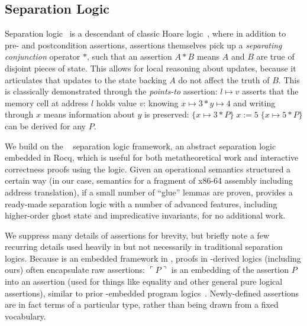\subsection{Separation Logic}
\label{sec:seplogic}
Separation logic~\cite{reynolds02} is a descendant of classic Hoare logic~\cite{hoare69},
where in addition to pre- and postcondition assertions, assertions themselves pick up a
\emph{separating conjunction} operator $\ast$, such that an assertion $A\ast B$ means $A$ and $B$ are true
of disjoint pieces of state. This allows for local reasoning about updates, because it articulates
that updates to the state backing $A$ do not affect the truth of $B$. This is classically demonstrated
through the \emph{points-to} assertion: $l\mapsto v$ asserts that the memory cell at address $l$ holds value $v$:
knowing $x\mapsto 3\ast y\mapsto 4$ and writing through $x$ means information about $y$ is preserved:
$\{x\mapsto 3\ast P\}\;x\mathrel{:=}5\;\{x\mapsto 5 \ast P\}$ can be derived for any $P$.

We build on the \iris~\cite{jung2018iris} separation logic framework,
an abstract separation logic embedded in Rocq, which is useful for both metatheoretical work
and interactive correctness proofs using the logic. Given an operational
semantics structured a certain way (in our case, semantics for
a fragment of x86-64 assembly including address translation),
if a small number of ``glue'' lemmas are proven, \iris
provides a ready-made separation logic with a number of advanced features, including
higher-order ghost state and impredicative invariants, for no additional work.

We suppress many details of \iris assertions for brevity, but briefly note
a few recurring details used heavily in \iris but not necessarily in traditional
separation logics.
Because \iris is an embedded framework in \rocq, proofs in \iris-derived
logics (including ours) often encapsulate raw \rocq assertions: $\ulcorner P \urcorner$ is an embedding
of the \rocq assertion $P$ into an \iris assertion (used for things like equality and other
general pure logical assertions), similar to prior \rocq-embedded program logics~\cite{Chlipala2013Bedrock}. Newly-defined \iris assertions are in fact
\rocq terms of a particular type, rather than being drawn from a fixed vocabulary.

